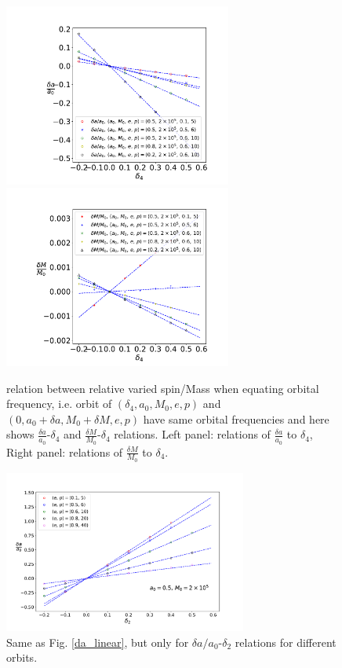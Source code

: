 \documentclass{article}
\begin{document}
\begin{figure}[!ht]
	\centering
	\includegraphics[width=7.5cm]{d4_spin_linear.pdf}
	\includegraphics[width=7.5cm]{d4_M_linear.pdf}
	\caption{relation between relative varied spin/Mass when equating orbital frequency, i.e. orbit of $(\delta_4, a_0, M_0,e,p)$ and $(0,a_0+\delta a, M_0+\delta M,e,p)$ have same orbital frequencies and here shows $\frac{\delta a}{a_0}$-$\delta_4$ and $\frac{\delta M}{M_0}$-$\delta_4$ relations. Left panel: relations of $\frac{\delta a}{a_0}$ to $\delta_4$, Right panel: relations of $\frac{\delta M}{M_0}$ to $\delta_4$.}
	\label{d4_linear}
\end{figure}

\begin{figure}[!ht]
	\centering
	\includegraphics[width=8cm]{d2_deltaspin_ep.pdf}
	
	\caption{Same as Fig. \ref{da_linear}, but only for $\delta a/a_0$-$\delta_2$ relations for different orbits.}
	\label{ep_slope}
\end{figure}
\end{document}
